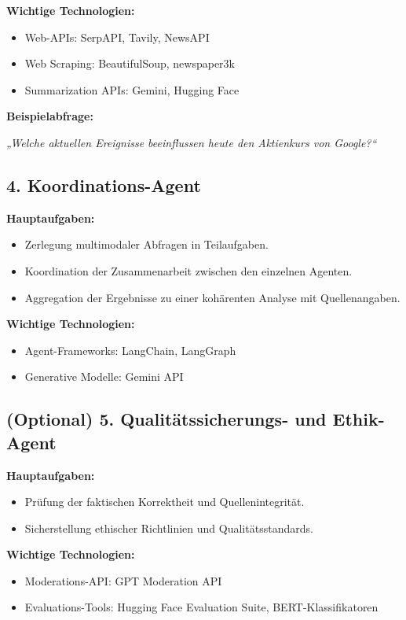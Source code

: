 \documentclass[12pt,a4paper]{article}
\begin{document}
\textbf{Wichtige Technologien:}
\begin{itemize}[noitemsep]
    \item Web-APIs: SerpAPI, Tavily, NewsAPI
    \item Web Scraping: BeautifulSoup, newspaper3k
    \item Summarization APIs: Gemini, Hugging Face
\end{itemize}

\textbf{Beispielabfrage:}

\textit{„Welche aktuellen Ereignisse beeinflussen heute den Aktienkurs von Google?“}

\subsection*{4. Koordinations-Agent}

\textbf{Hauptaufgaben:}
\begin{itemize}[noitemsep]
    \item Zerlegung multimodaler Abfragen in Teilaufgaben.
    \item Koordination der Zusammenarbeit zwischen den einzelnen Agenten.
    \item Aggregation der Ergebnisse zu einer kohärenten Analyse mit Quellenangaben.
\end{itemize}

\textbf{Wichtige Technologien:}
\begin{itemize}[noitemsep]
    \item Agent-Frameworks: LangChain, LangGraph
    \item Generative Modelle: Gemini API
\end{itemize}

\subsection*{(Optional) 5. Qualitätssicherungs- und Ethik-Agent}

\textbf{Hauptaufgaben:}
\begin{itemize}[noitemsep]
    \item Prüfung der faktischen Korrektheit und Quellenintegrität.
    \item Sicherstellung ethischer Richtlinien und Qualitätsstandards.
\end{itemize}

\textbf{Wichtige Technologien:}
\begin{itemize}[noitemsep]
    \item Moderations-API: GPT Moderation API
    \item Evaluations-Tools: Hugging Face Evaluation Suite, BERT-Klassifikatoren
\end{itemize}
\end{document}
